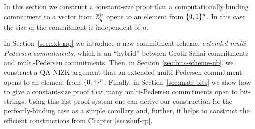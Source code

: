 In this section we construct a constant-size proof that a computationally binding commitment to a vector from $\mathbb{Z}_q^n$ opens to an element from $\{0,1\}^n$. In this case the size of the commitment is independent of $n$. 

In Section~\ref{sec:ext-mp} we introduce a new commitment scheme, \emph{extended multi-Pedersen commitments}, which is an ``hybrid'' between Groth-Sahai commitments and multi-Pedersen commitments.
Then, in Section~\ref{sec:bits-scheme-nb}, we construct a QA-NIZK argument that an extended multi-Pedersen commitment opens to an element from $\{0,1\}^n$. Finally, in Section~\ref{sec:matr-bits} we show how to give a constant-size proof that many multi-Pedersen commitments open to bit-strings. Using this last proof system one can derive our construction for the perfectly-binding case as a simple corollary and, further, it helps to construct the efficient constructions from Chapter \ref{sec:shuf-rp}.
